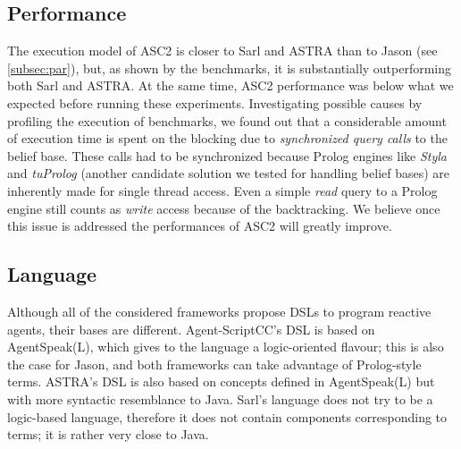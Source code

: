 \subsection{Performance}
The execution model of ASC2 is closer to Sarl and ASTRA than to Jason (see \ref{subsec:par}), but, as shown by the benchmarks, it is substantially outperforming both Sarl and ASTRA. At the same time, ASC2 performance was below what we expected before running these experiments. Investigating possible causes by profiling the execution of benchmarks, we found out that a considerable amount of execution time is spent on the blocking due to \textit{synchronized query calls} to the belief base. These calls had to be synchronized because Prolog engines like \textit{Styla} and \textit{tuProlog} \cite{tuprolog} (another candidate solution we tested for handling belief bases) are inherently made for single thread access. Even a simple \textit{read} query to a Prolog engine still counts as \textit{write} access because of the backtracking.
We believe once this issue is addressed the performances of ASC2 will greatly improve.


\subsection{Language}

Although all of the considered frameworks propose DSLs to program reactive agents, their bases are different. %
Agent-ScriptCC's DSL is based on AgentSpeak(L), which gives to the language a logic-oriented flavour; this is also the case for Jason, and both frameworks can take advantage of Prolog-style terms. ASTRA's DSL is also based on concepts defined in AgentSpeak(L) but with more syntactic resemblance to Java. Sarl's language does not try to be a logic-based language, therefore it does not contain components corresponding to terms; it is rather very close to Java.



